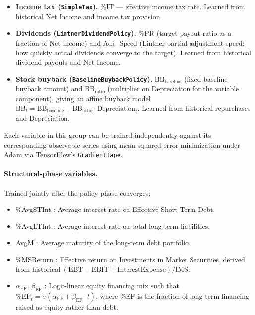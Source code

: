 \documentclass[12pt,a4paper]{article}
\begin{document}
\begin{itemize}
\item \textbf{Income tax (\texttt{SimpleTax}).}
  \%IT --- effective income tax rate. Learned from historical Net
  Income and income tax provision.

\item \textbf{Dividends (\texttt{LintnerDividendPolicy}).}
  \%PR (target payout ratio as a fraction of Net Income) and
  Adj.\ Speed (Lintner partial-adjustment speed: how quickly actual
  dividends converge to the target). Learned from historical dividend
  payouts and Net Income.

\item \textbf{Stock buyback (\texttt{BaselineBuybackPolicy}).}
  $\text{BB}_{\text{baseline}}$ (fixed baseline buyback amount) and
  $\text{BB}_{\text{ratio}}$ (multiplier on Depreciation for the
  variable component), giving an affine buyback model
  $\text{BB}_t = \text{BB}_{\text{baseline}} + \text{BB}_{\text{ratio}}
  \cdot \text{Depreciation}_t$. Learned from historical repurchases
  and Depreciation.
\end{itemize}

Each variable in this group can be trained independently against its
corresponding observable series using mean-squared error minimization
under Adam via TensorFlow's \texttt{GradientTape}.

\paragraph{Structural-phase variables.}
Trained jointly after the policy phase converges:

\begin{itemize}
\item \%AvgSTInt : Average interest rate on Effective Short-Term Debt.

\item \%AvgLTInt : Average interest rate on total long-term liabilities.

\item AvgM : Average maturity of the long-term debt portfolio.

\item \%MSReturn : Effective return on Investments in Market
  Securities, derived from historical
  $(\text{EBT} - \text{EBIT} + \text{InterestExpense}) / \text{IMS}$.

\item $\alpha_{\text{EF}}$, $\beta_{\text{EF}}$ : Logit-linear equity
  financing mix such that
  $\text{\%EF}_t = \sigma(\alpha_{\text{EF}} + \beta_{\text{EF}} \cdot t)$,
  where \%EF is the fraction of long-term financing raised as equity
  rather than debt.
\end{itemize}
\end{document}
